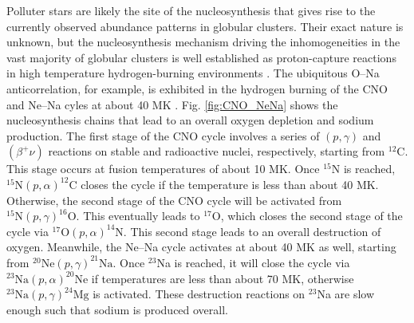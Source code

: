 Polluter stars are likely the site of the nucleosynthesis that gives rise to the currently observed abundance patterns in globular clusters. Their exact nature is unknown, but the nucleosynthesis mechanism driving the inhomogeneities in the vast majority of globular clusters is well established as proton-capture reactions in high temperature hydrogen-burning environments \cite{Denisenkov1989,Langer1993}. The ubiquitous O--Na anticorrelation, for example, is exhibited in the hydrogen burning of the CNO and Ne--Na cyles at about 40 MK \cite{Gratton2019}. Fig. \ref{fig:CNO_NeNa} shows the nucleosynthesis chains that lead to an overall oxygen depletion and sodium production. The first stage of the CNO cycle involves a series of $(p, \gamma)$ and $(\beta^{+}\nu)$ reactions on stable and radioactive nuclei, respectively, starting from $^{12}$C. This stage occurs at fusion temperatures of about 10 MK. Once $^{15}$N is reached, $^{15}\mathrm{N}(p, \alpha)^{12}\mathrm{C}$ closes the cycle if the temperature is less than about 40 MK. Otherwise, the second stage of the CNO cycle will be activated from $^{15}\mathrm{N}(p, \gamma)^{16}\mathrm{O}$. This eventually leads to $^{17}$O, which closes the second stage of the cycle via $^{17}\mathrm{O}(p, \alpha)^{14}\mathrm{N}$. This second stage leads to an overall destruction of oxygen. Meanwhile, the Ne--Na cycle activates at about 40 MK as well, starting from $^{20}\mathrm{Ne}(p, \gamma)^{21}\mathrm{Na}$. Once $^{23}$Na is reached, it will close the cycle via $^{23}\mathrm{Na}(p, \alpha)^{20}\mathrm{Ne}$ if temperatures are less than about 70 MK, otherwise $^{23}\mathrm{Na}(p, \gamma)^{24}\mathrm{Mg}$ is activated. These destruction reactions on $^{23}$Na are slow enough such that sodium is produced overall.

\def\BoxSpace{0.3} %
\def\BoxSpacetwo{\BoxSpace * 2} %
\def\BoxSpacethree{\BoxSpace * 3}
\def\BoxSpacehalf{\BoxSpace * 0.5}
\def\AOS{0.2} %
\def\AW{0.52} %

